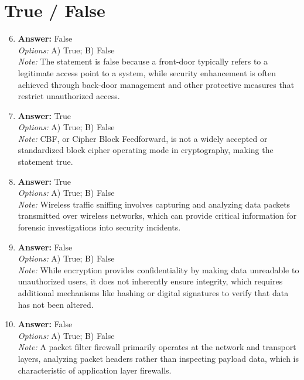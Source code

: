 \documentclass[12pt]{article}
\begin{document}
\section*{True / False}
\begin{enumerate}[label=\arabic*.]
\setcounter{enumi}{5}
\item \textbf{Answer:} False
\\ \textit{Options:} A) True; B) False
\\ \textit{Note:} The statement is false because a front-door typically refers to a legitimate access point to a system, while security enhancement is often achieved through back-door management and other protective measures that restrict unauthorized access.
\item \textbf{Answer:} True
\\ \textit{Options:} A) True; B) False
\\ \textit{Note:} CBF, or Cipher Block Feedforward, is not a widely accepted or standardized block cipher operating mode in cryptography, making the statement true.
\item \textbf{Answer:} True
\\ \textit{Options:} A) True; B) False
\\ \textit{Note:} Wireless traffic sniffing involves capturing and analyzing data packets transmitted over wireless networks, which can provide critical information for forensic investigations into security incidents.
\item \textbf{Answer:} False
\\ \textit{Options:} A) True; B) False
\\ \textit{Note:} While encryption provides confidentiality by making data unreadable to unauthorized users, it does not inherently ensure integrity, which requires additional mechanisms like hashing or digital signatures to verify that data has not been altered.
\item \textbf{Answer:} False
\\ \textit{Options:} A) True; B) False
\\ \textit{Note:} A packet filter firewall primarily operates at the network and transport layers, analyzing packet headers rather than inspecting payload data, which is characteristic of application layer firewalls.
\end{enumerate}
\end{document}
